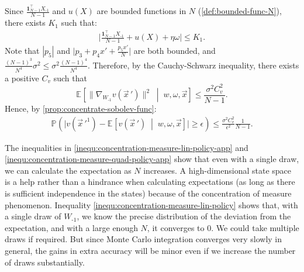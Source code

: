 \documentclass[12pt]{article}
\newcommand{\condexpec}[3][]{\ensuremath{\mathbb{E}_{#1}\left[{#2} \; \middle| \; {#3} \right]}}
\newcommand{\prob}[2][]{\ensuremath{\mathbb{P}_{#1}\left( {#2} \right)}}
\begin{document}
Since $\frac{\mathbf{1}_{N-1}^\top X_{\text{-}1}}{N-1}$ and $u(X)$ are bounded functions in $N$ (\cref{def:bounded-func-N}), there exists $K_1$ such that:
\begin{align*}
\big|\frac{\mathbf{1}_{N-1}^\top X_{\text{-}1}}{N-1}+u(X)+\eta \omega\big| \leq K_1.
\end{align*}
Note that $|p_5|$  and $\big|p_3+p_4x' + \frac{p_5 x'}{N}\big|$ are both bounded, and $\frac{(N-1)^3}{N^4} \sigma^2 \leq \sigma^2 \frac{(N-1)^4}{N^4}$. Therefore, by the Cauchy-Schwarz inequality, there exists a positive $C_v$ such that 
\begin{equation*}
\condexpec{\|\nabla_{{W_{\text{-}1}}}v(\vec{x}\,')\|^2}{w,\omega, \vec{x}} \leq \frac{\sigma^2 C_v^2}{N-1}.
\end{equation*}
Hence, by \cref{prop:concentrate-sobolev-func}:
\begin{align}
\label{inequ:concentration-measure-quad-policy-app}
\prob{\big|v(\vec{x}\,'^1)-\condexpec{v(\vec{x}\,')}{w,\omega, \vec{x}}\big|\geq \epsilon} \leq \frac{\sigma^2 C_v^2}{\epsilon^2} \frac{1}{N-1}.
\end{align}
	 
The inequalities in \cref{inequ:concentration-measure-lin-policy-app} and \cref{inequ:concentration-measure-quad-policy-app} show that even with a single draw, we can calculate the expectation as $N$ increases. A high-dimensional state space is a help rather than a hindrance when calculating expectations (as long as there is sufficient independence in the states) because of the concentration of measure phenomenon. Inequality \cref{inequ:concentration-measure-lin-policy} shows that, with a single draw of $W_{\text{-}1}$, we know the precise distribution of the deviation from the expectation, and with a large enough $N$, it converges to $0$. We could take multiple draws if required. But since Monte Carlo integration converges very slowly in general, the gains in extra accuracy will be minor even if we increase the number of draws substantially.
	
\end{document}
